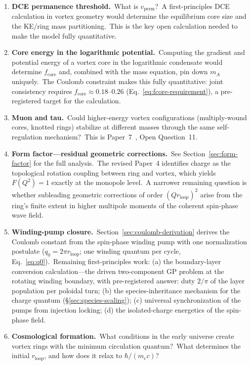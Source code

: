\documentclass[12pt,letterpaper]{article}
\newcommand{\rloop}{r_{\mathrm{loop}}}
\begin{document}
\begin{enumerate}[leftmargin=2em]
  \item \textbf{DCE permanence threshold.}\ What is $v_{\mathrm{perm}}$?\ A
    first-principles DCE calculation in vortex geometry would determine the
    equilibrium core size and the KE/ring mass partitioning.\ This is the
    key open calculation needed to make the model fully quantitative.

  \item \textbf{Core energy in the logarithmic potential.}\ Computing the
    gradient and potential energy of a vortex core in the logarithmic
    condensate would determine $f_{\mathrm{core}}$ and, combined with the
    mass equation, pin down $m_A$ uniquely.\ The Coulomb constraint makes
    this fully quantitative: joint consistency requires
    $f_{\mathrm{core}} \approx 0.18$--$0.26$
    (Eq.~\ref{eq:fcore-requirement}), a pre-registered target for the
    calculation.

  \item \textbf{Muon and tau.}\ Could higher-energy vortex configurations
    (multiply-wound cores, knotted rings) stabilize at different masses
    through the same self-regulation mechanism?\ This is
    Paper~7~\cite{otto-quantum}, Open Question~11.

  \item \textbf{Form factor---residual geometric corrections.}\ See
    Section~\ref{sec:form-factor} for the full analysis.\ The revised
    Paper~4 \cite{otto-em} identifies charge as the topological rotation
    coupling between ring and vortex, which yields $F(Q^2) = 1$ exactly at
    the monopole level.\ A narrower remaining question is whether
    subleading geometric corrections of order $(Q r_{\mathrm{loop}})^2$ arise
    from the ring's finite extent in higher multipole moments of the
    coherent spin-phase wave field.

  \item \textbf{Winding-pump closure.}\
    Section~\ref{sec:coulomb-derivation} derives the Coulomb constant
    from the spin-phase winding pump with one normalization postulate
    ($q_0 = 2\pi\rloop$; one winding quantum per cycle,
    Eq.~\ref{eq:q0}).\ Remaining first-principles work:
    (a) the boundary-layer conversion calculation---the driven
    two-component GP problem at the rotating winding boundary, with
    pre-registered answer: duty $2/\pi$ of the layer population per
    poloidal turn; (b) the species-inheritance mechanism for the charge
    quantum (§\ref{sec:species-scaling}); (c) universal synchronization
    of the pumps from injection locking; (d) the isolated-charge
    energetics of the spin-phase field.

  \item \textbf{Cosmological formation.}\ What conditions in the early
    universe create vortex rings with the minimum circulation quantum?\ What
    determines the initial $\rloop$, and how does it relax to
    $\hbar/(m_e c)$?
\end{enumerate}
\end{document}
